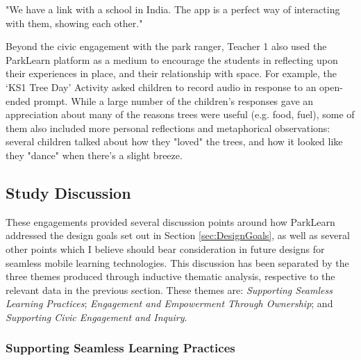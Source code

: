 \begin{displayquote}
"We have a link with a school in India. The app is a perfect way of interacting with them, showing each other."
\end{displayquote}

Beyond the civic engagement with the park ranger, Teacher 1 also used the ParkLearn platform as a medium to encourage the students in reflecting upon their experiences in place, and their relationship with space. For example, the `KS1 Tree Day' Activity asked children to record audio in response to an open-ended prompt. While a large number of the children's responses gave an appreciation about many of the reasons trees were useful (e.g. food, fuel), some of them also included more personal reflections and metaphorical observations: several children talked about how they "loved" the trees, and how it looked like they "dance" when there's a slight breeze.

\subsection{Study Discussion}
\label{sec:TeacherDiscussion}
These engagements provided several discussion points around how ParkLearn addressed the design goals set out in Section \ref{sec:DesignGoals}, as well as several other points which I believe should bear consideration in future designs for seamless mobile learning technologies. This discussion has been separated by the three themes produced through inductive thematic analysis, respective to the relevant data in the previous section. These themes are: \textit{Supporting Seamless Learning Practices}; \textit{Engagement and Empowerment Through Ownership}; and \textit{Supporting Civic Engagement and Inquiry}.

\subsubsection{Supporting Seamless Learning Practices}

